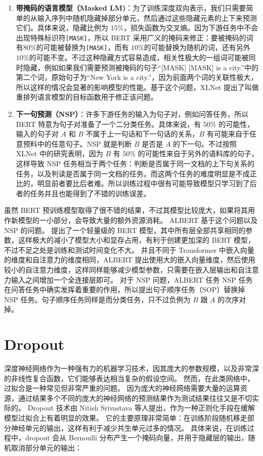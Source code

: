 \begin{enumerate}[(1)]
	\item \textbf{带掩码的语言模型（Masked LM)}：为了训练深度双向表示，我们只需要简单的从输入序列中随机隐藏掉部分单元，然后通过这些隐藏元素的上下来预测它们。具体来说，隐藏比例为 $15\%$，损失函数为交叉熵。因为下游任务中不会出现特殊标识符\texttt{[MASK]}，所以 BERT 采用广义的掩码来修正：要被掩码的词有$80\%$的可能被替换为\texttt{[MASK]}，而有 $10\%$的可能替换为随机的词，还有另外 $10\%$的可能不变。不过这种隐藏方式容易造成，相关性极大的一组词可能被同时隐藏，例如如果我们需要预测被掩码的句子“[MASK] [MASK] is a city.”中的第二个词，原始句子为“New York is a city.”，因为前面两个词的关联性极大，所以这样的情况会显著的影响模型的性能。基于这个问题，XLNet \cite{cite}提出了叫做重排列语言模型的目标函数用于修正该问题。
	\item \textbf{下一句预测（NSP）}：许多下游任务的输入为句子对，例如问答任务，所以 BERT 特意为句子对准备了一个二分类任务。具体来说，有 $50\%$ 的可能性，输入的句子对 $A$ 和 $B$ 不属于上一句话和下一句话的关系，$B$ 有可能来自于任意预料中的任意句子。NSP 就是判断 $B$ 是否是 $A$ 的下一句。不过按照 XLNet \cite{xlnet}中的研究表明，因为 $B$ 有 $50\%$ 的可能性来自于另外的语料库的句子，这样导致 NSP 任务相当于两个任务：判断是否属于同一文档的上下句关系的任务，以及判读是否属于同一文档的任务。而这两个任务的难度明显是不成正比的，明显前者要比后者难。所以训练过程中很有可能导致模型只学习到了后者的任务并且也能得到了不错的训练误差。
\end{enumerate}

虽然 BERT 预训练模型取得了很不错的结果，不过其模型比较庞大，如果将其用作新模型的一小部分，会导致大量的额外资源消耗。
ALBERT\cite{albert} 基于这个问题以及 NSP 的问题。
提出了一个轻量级的 BERT 模型，其中所有层全部共享相同的参数，这样极大的减小了模型大小和显存占用，有利于创建更加深的 BERT 模型，不过不足之处是训练和测试时间变化不大。
并且不同于 Transformer 中嵌入向量的维度和自注意力的维度相同，ALBERT 提出使用大的嵌入向量维度，然后使用较小的自注意力维度，这样同样能够减少模型参数，只需要在嵌入层输出和自注意力输入之间增加一个全连接层即可。
对于 NSP 问题，ALBERT 任务 NSP 任务在问答任务中确实发挥着重要的作用，所以提出句子顺序任务（SOP）替换掉 NSP 任务。句子顺序任务同样是而分类任务，只不过负例为 $B$ 跟 $A$ 的次序对掉。 

\section{Dropout}
深度神经网络作为一种强有力的机器学习技术，因其庞大的参数规模，以及非常深的非线性复合函数，它们能够表达相当复杂的假设空间。
然而，在此类网络中，过拟合是一种常见但非常严重的问题。
因为庞大的神经网络需要大量的运算资源，通过结果多个不同的庞大的神经网络的预测结果作为测试结果往往又是不切实际的。
Dropout\cite{dropout} 技术由 Nitish Srivastava 等人提出，作为一种正则化手段在缓解模型过拟合上有着明显的效果。
它的主要原理非常简单：在训练阶段随机移走部分神经单元的输出，这样有利于减少共生单元过多的情况。
具体来说，在训练过程中，dropout 会从 Bernoulli 分布产生一个掩码向量，并用于隐藏层的输出，随机取消部分单元的输出：

